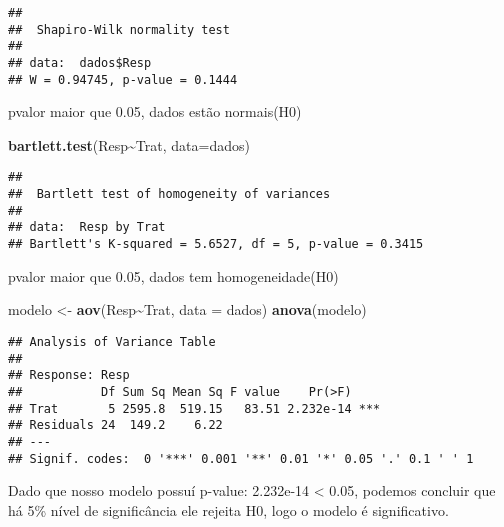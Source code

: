 \documentclass[
]{article}
\newenvironment{Shaded}{\begin{snugshade}}{\end{snugshade}}
\newcommand{\AttributeTok}[1]{\textcolor[rgb]{0.13,0.29,0.53}{#1}}
\newcommand{\FunctionTok}[1]{\textcolor[rgb]{0.13,0.29,0.53}{\textbf{#1}}}
\newcommand{\NormalTok}[1]{#1}
\newcommand{\OtherTok}[1]{\textcolor[rgb]{0.56,0.35,0.01}{#1}}
\newcommand{\SpecialCharTok}[1]{\textcolor[rgb]{0.81,0.36,0.00}{\textbf{#1}}}
\begin{document}
\begin{Shaded}
\end{Shaded}

\begin{verbatim}
## 
##  Shapiro-Wilk normality test
## 
## data:  dados$Resp
## W = 0.94745, p-value = 0.1444
\end{verbatim}

pvalor maior que 0.05, dados estão normais(H0)

\begin{Shaded}
\begin{Highlighting}[]
\FunctionTok{bartlett.test}\NormalTok{(Resp}\SpecialCharTok{\textasciitilde{}}\NormalTok{Trat, }\AttributeTok{data=}\NormalTok{dados)}
\end{Highlighting}
\end{Shaded}

\begin{verbatim}
## 
##  Bartlett test of homogeneity of variances
## 
## data:  Resp by Trat
## Bartlett's K-squared = 5.6527, df = 5, p-value = 0.3415
\end{verbatim}

pvalor maior que 0.05, dados tem homogeneidade(H0)

\begin{Shaded}
\begin{Highlighting}[]
\NormalTok{modelo }\OtherTok{\textless{}{-}} \FunctionTok{aov}\NormalTok{(Resp}\SpecialCharTok{\textasciitilde{}}\NormalTok{Trat, }\AttributeTok{data =}\NormalTok{ dados)}
\FunctionTok{anova}\NormalTok{(modelo) }
\end{Highlighting}
\end{Shaded}

\begin{verbatim}
## Analysis of Variance Table
## 
## Response: Resp
##           Df Sum Sq Mean Sq F value    Pr(>F)    
## Trat       5 2595.8  519.15   83.51 2.232e-14 ***
## Residuals 24  149.2    6.22                      
## ---
## Signif. codes:  0 '***' 0.001 '**' 0.01 '*' 0.05 '.' 0.1 ' ' 1
\end{verbatim}

Dado que nosso modelo possuí p-value: 2.232e-14 \textless{} 0.05,
podemos concluir que há 5\% nível de significância ele rejeita H0, logo
o modelo é significativo.
\end{document}
